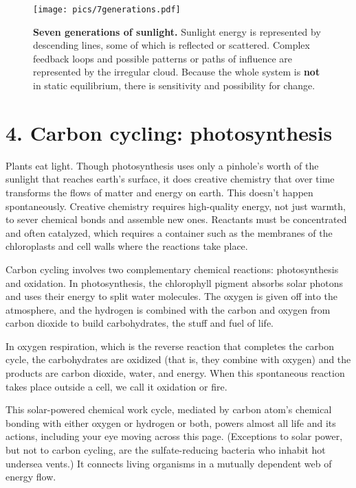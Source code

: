 \documentclass[11pt,letterpaper,twoside,onecolumn]{memoir}
\begin{document}
\begin{figure}
\texttt{[image: pics/7generations.pdf]}
\caption*{\textbf{Seven generations of sunlight.} Sunlight energy is represented by descending lines, some of which is reflected or scattered. Complex feedback loops and possible patterns or paths of influence are represented by the irregular cloud. Because the whole system is \textbf{not} in static equilibrium, there is sensitivity and possibility for change.}
\end{figure}

\section*{4. Carbon cycling: photosynthesis}

Plants eat light. Though photosynthesis uses only a pinhole's worth of the sunlight that reaches earth's surface, it does creative chemistry that over time transforms the flows of matter and energy on earth. This doesn't happen spontaneously. Creative chemistry requires high-quality energy, not just warmth, to sever chemical bonds and assemble new ones. Reactants must be concentrated and often catalyzed, which requires a container such as the membranes of the chloroplasts and cell walls where the reactions take place.

Carbon cycling involves two complementary chemical reactions: photosynthesis and oxidation. In photosynthesis, the chlorophyll pigment absorbs solar photons and uses their energy to split water molecules. The oxygen is given off into the atmosphere, and the hydrogen is combined with the carbon and oxygen from carbon dioxide to build carbohydrates, the stuff and fuel of life.

In oxygen respiration, which is the reverse reaction that completes the carbon cycle, the carbohydrates are oxidized (that is, they combine with oxygen) and the products are carbon dioxide, water, and energy. When this spontaneous reaction takes place outside a cell, we call it oxidation or fire.

This solar-powered chemical work cycle, mediated by carbon atom's chemical bonding with either oxygen or hydrogen or both, powers almost all life and its actions, including your eye moving across this page. (Exceptions to solar power, but not to carbon cycling, are the sulfate-reducing bacteria who inhabit hot undersea vents.) It connects living organisms in a mutually dependent web of energy flow. 

\end{document}
